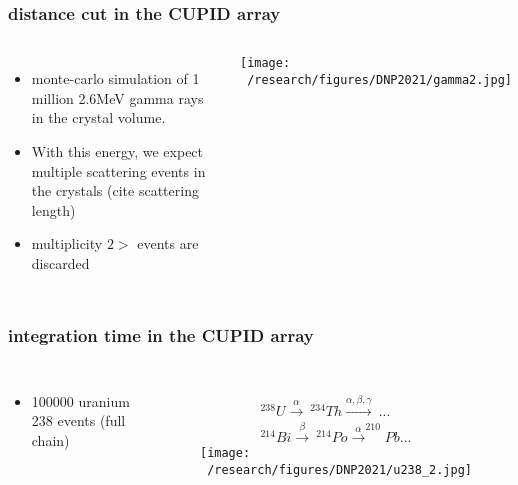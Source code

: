 \documentclass{beamer}
\begin{document}


	\begin{frame}
		\frametitle{distance cut in the CUPID array}
		\begin{columns}[c] %
			
			\begin{itemize}
				\item monte-carlo simulation of 1 million 2.6MeV gamma rays in the crystal volume.
				\item With this energy, we expect multiple scattering events in the crystals (cite scattering length)
				\item multiplicity $2>$ events are discarded
			\end{itemize}
			
			
			\texttt{[image: ~/research/figures/DNP2021/gamma2.jpg]}
			
			
		\end{columns}
	\end{frame}



	\begin{frame}
		\frametitle{integration time in the CUPID array}
		\begin{columns}[c] %
			
			\begin{itemize}
				\item 100000 uranium 238 events (full chain)
			\end{itemize}
			
			\begin{figure}
			\begin{eqnarray*}
			^{238}U \xrightarrow{\alpha} \  ^{234}Th \xrightarrow{\alpha ,\beta ,\gamma} \  ... \\ ^{214}Bi \xrightarrow{\beta} \  ^{214}Po \xrightarrow{\alpha} ^{210}Pb ...
			\end{eqnarray*}
			\texttt{[image: ~/research/figures/DNP2021/u238\_2.jpg]}
			\end{figure}
			
		\end{columns}
	\end{frame}
\end{document}
